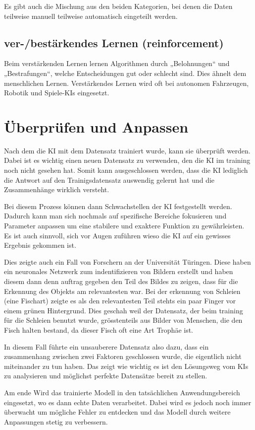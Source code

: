 Es gibt auch die Mischung aus den beiden Kategorien, bei denen die Daten teilweise manuell teilweise automatisch eingeteilt werden.

\subsection{ver-/bestärkendes Lernen (reinforcement)}
Beim verstärkenden Lernen lernen Algorithmen durch „Belohnungen“ und „Bestrafungen“, welche Entscheidungen gut oder schlecht sind. Dies ähnelt dem menschlichen Lernen. 
Verstärkendes Lernen wird oft bei autonomen Fahrzeugen, Robotik und Spiele-KIs eingesetzt.

\section{Überprüfen und Anpassen}
Nach dem die KI mit dem Datensatz trainiert wurde, kann sie überprüft werden. Dabei ist es wichtig einen neuen Datensatz zu verwenden, den die KI im training noch nicht gesehen hat. Somit kann ausgeschlossen werden, dass die KI lediglich die Antwort auf den Trainigsdatensatz auswendig gelernt hat und die Zusammenhänge wirklich versteht.

Bei diesem Prozess können dann Schwachstellen der KI festgestellt werden. Dadurch kann man sich nochmals auf spezifische Bereiche fokusieren und Parameter anpassen um eine stabilere und exaktere Funktion zu gewährleisten.
Es ist auch sinnvoll, sich vor Augen zuführen wieso die KI auf ein gewisses Ergebnis gekommen ist.

Dies zeigte auch ein Fall von Forschern an der Universität Türingen. \citep{tench-messy-data}
Diese haben ein neuronales Netzwerk zum indentifizieren von Bildern erstellt und haben diesem dann denn auftrag gegeben den Teil des Bildes zu zeigen, dass für die Erkennung des Objekts am relevantesten war.
Bei der erkennung von Schleien (eine Fischart) zeigte es als den relevantesten Teil stehts ein paar Finger vor einem grünen Hintergrund. Dies geschah weil der Datensatz, der beim training für die Schleien benutzt wurde, grösstenteils aus Bilder von Menschen, die den Fisch halten bestand, da dieser Fisch oft eine Art Trophäe ist.

\noindent
In diesem Fall führte ein unsauberere Datensatz also dazu, dass ein zusammenhang zwischen zwei Faktoren geschlossen wurde, die eigentlich nicht miteinander zu tun haben. Das zeigt wie wichtig es ist den Lösungsweg vom KIs zu analysieren und möglichst perfekte Datensätze bereit zu stellen.

Am ende Wird das trainierte Modell in den tatsächlichen Anwendungsbereich eingesetzt, wo es dann echte Daten verarbeitet. 
Dabei wird es jedoch noch immer überwacht um mögliche Fehler zu entdecken und das Modell durch weitere Anpassungen stetig zu verbessern.